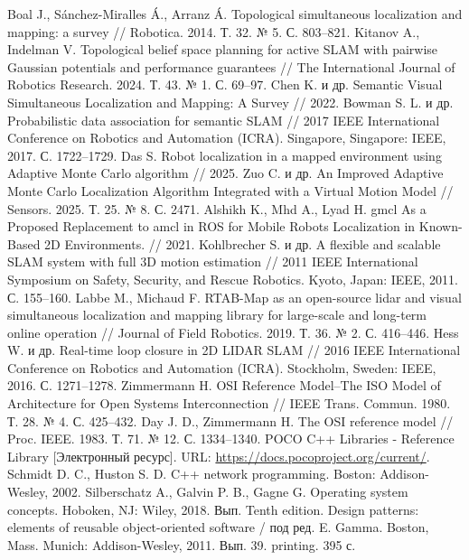 \documentclass[a4paper, 14pt]{extreport}
\begin{document}
\begin{thebibliography}{9}
          Boal J., Sánchez-Miralles Á., Arranz Á. Topological simultaneous localization and mapping: a survey // Robotica. 2014. Т. 32. № 5. С. 803–821.
          Kitanov A., Indelman V. Topological belief space planning for active SLAM with pairwise Gaussian potentials and performance guarantees // The International Journal of Robotics Research. 2024. Т. 43. № 1. С. 69–97.
          Chen K. и др. Semantic Visual Simultaneous Localization and Mapping: A Survey // 2022.
          Bowman S. L. и др. Probabilistic data association for semantic SLAM // 2017 IEEE International Conference on Robotics and Automation (ICRA). Singapore, Singapore: IEEE, 2017. С. 1722–1729.
           Das S. Robot localization in a mapped environment using Adaptive Monte Carlo algorithm // 2025.
          Zuo C. и др. An Improved Adaptive Monte Carlo Localization Algorithm Integrated with a Virtual Motion Model // Sensors. 2025. Т. 25. № 8. С. 2471.
           Alshikh K., Mhd A., Lyad H. gmcl As a Proposed Replacement to amcl in ROS for Mobile Robots Localization in Known-Based 2D Environments. // 2021.
         Kohlbrecher S. и др. A flexible and scalable SLAM system with full 3D motion estimation // 2011 IEEE International Symposium on Safety, Security, and Rescue Robotics. Kyoto, Japan: IEEE, 2011. С. 155–160.
          Labbe M., Michaud F. RTAB-Map as an open-source lidar and visual simultaneous localization and mapping library for large-scale and long-term online operation // Journal of Field Robotics. 2019. Т. 36. № 2. С. 416–446.
         Hess W. и др. Real-time loop closure in 2D LIDAR SLAM // 2016 IEEE International Conference on Robotics and Automation (ICRA). Stockholm, Sweden: IEEE, 2016. С. 1271–1278.
          Zimmermann H. OSI Reference Model--The ISO Model of Architecture for Open Systems Interconnection // IEEE Trans. Commun. 1980. Т. 28. № 4. С. 425–432.
         Day J. D., Zimmermann H. The OSI reference model // Proc. IEEE. 1983. Т. 71. № 12. С. 1334–1340.
         POCO C++ Libraries - Reference Library [Электронный ресурс]. URL: \url{https://docs.pocoproject.org/current/}.
         Schmidt D. C., Huston S. D. C++ network programming. Boston: Addison-Wesley, 2002.
         Silberschatz A., Galvin P. B., Gagne G. Operating system concepts. Hoboken, NJ: Wiley, 2018. Вып. Tenth edition.
         Design patterns: elements of reusable object-oriented software / под ред. E. Gamma. Boston, Mass. Munich: Addison-Wesley, 2011. Вып. 39. printing. 395 с.

\end{thebibliography}
\end{document}
